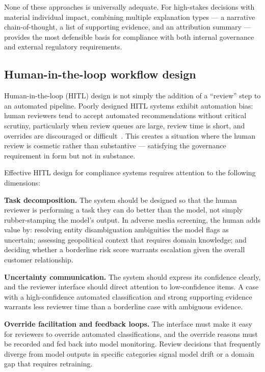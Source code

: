 None of these approaches is universally adequate. For high-stakes decisions with material individual impact, combining multiple explanation types --- a narrative chain-of-thought, a list of supporting evidence, and an attribution summary --- provides the most defensible basis for compliance with both internal governance and external regulatory requirements.

\subsection{Human-in-the-loop workflow design}
\label{sec:ch11-human-in-loop}

Human-in-the-loop (HITL) design is not simply the addition of a ``review'' step to an automated pipeline. Poorly designed HITL systems exhibit automation bias: human reviewers tend to accept automated recommendations without critical scrutiny, particularly when review queues are large, review time is short, and overrides are discouraged or difficult~\cite{batarseh2021survey}. This creates a situation where the human review is cosmetic rather than substantive --- satisfying the governance requirement in form but not in substance.

Effective HITL design for compliance systems requires attention to the following dimensions:

\textbf{Task decomposition.} The system should be designed so that the human reviewer is performing a task they can do better than the model, not simply rubber-stamping the model's output. In adverse media screening, the human adds value by: resolving entity disambiguation ambiguities the model flags as uncertain; assessing geopolitical context that requires domain knowledge; and deciding whether a borderline risk score warrants escalation given the overall customer relationship.

\textbf{Uncertainty communication.} The system should express its confidence clearly, and the reviewer interface should direct attention to low-confidence items. A case with a high-confidence automated classification and strong supporting evidence warrants less reviewer time than a borderline case with ambiguous evidence.

\textbf{Override facilitation and feedback loops.} The interface must make it easy for reviewers to override automated classifications, and the override reasons must be recorded and fed back into model monitoring. Review decisions that frequently diverge from model outputs in specific categories signal model drift or a domain gap that requires retraining.

